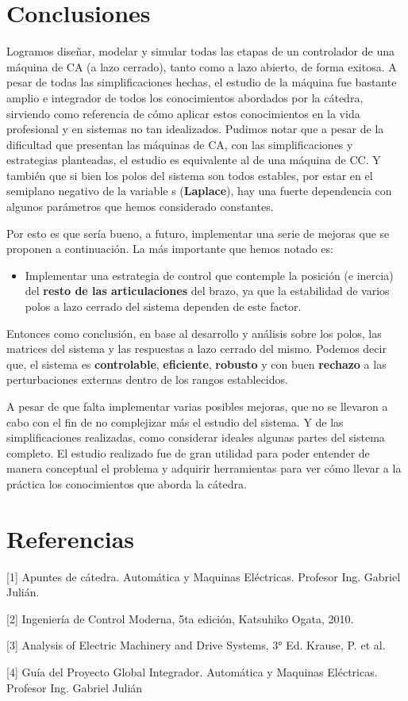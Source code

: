 \documentclass[10pt]{article}
\begin{document}
\section{Conclusiones}
Logramos diseñar, modelar y simular todas las etapas de un controlador de una máquina de CA (a lazo cerrado), tanto como a lazo abierto, de forma exitosa.
A pesar de todas las simplificaciones hechas, el estudio de la máquina fue bastante amplio e integrador de todos los conocimientos abordados por la cátedra, sirviendo como referencia de cómo aplicar estos conocimientos en la vida profesional y en sistemas no tan idealizados.
Pudimos notar que a pesar de la dificultad que presentan las máquinas de CA, con las simplificaciones y estrategias planteadas, el estudio es equivalente al de una máquina de CC.
Y también que si bien los polos del sistema son todos estables, por estar en el semiplano negativo de la variable s (\textbf{Laplace}), hay una fuerte dependencia con algunos parámetros que hemos considerado constantes.
\par
Por esto es que sería bueno, a futuro, implementar una serie de mejoras que se proponen a continuación.
La más importante que hemos notado es:
\begin{itemize}
	\item Implementar una estrategia de control que contemple la posición (e inercia) del \textbf{resto de las articulaciones} del brazo, ya que la estabilidad de varios polos a lazo cerrado del sistema dependen de este factor.
\end{itemize}

Entonces como conclusión, en base al desarrollo y análisis sobre los polos, las matrices del sistema y las respuestas a lazo cerrado del mismo.
Podemos decir que, el sistema es \textbf{controlable}, \textbf{eficiente}, \textbf{robusto} y con buen \textbf{rechazo} a las perturbaciones externas dentro de los rangos establecidos.
\par
A pesar de que falta implementar varias posibles mejoras, que no se llevaron a cabo con el fin de no complejizar más el estudio del sistema.
Y de las simplificaciones realizadas, como considerar ideales algunas partes del sistema completo.
El estudio realizado fue de gran utilidad para poder entender de manera conceptual el problema y adquirir herramientas para ver cómo llevar a la práctica los conocimientos que aborda la cátedra.

\section{Referencias}

[1] Apuntes de cátedra. Automática y Maquinas Eléctricas. Profesor Ing. Gabriel Julián.

[2] Ingeniería de Control Moderna, 5ta edición, Katsuhiko Ogata, 2010.

[3] Analysis of Electric Machinery and Drive Systems, 3° Ed. Krause, P. et al.

[4] Guía del Proyecto Global Integrador. Automática y Maquinas Eléctricas. Profesor Ing. Gabriel Julián
\end{document}
